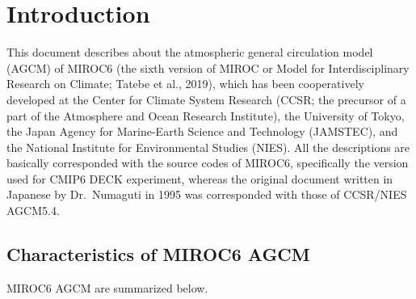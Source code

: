 \hypertarget{introduction}{%
\section{Introduction}\label{introduction}}

This document describes about the atmospheric general circulation model (AGCM) of MIROC6 (the sixth version of MIROC or Model for Interdisciplinary Research on Climate; Tatebe et al., 2019), which has
been cooperatively developed at the Center for Climate System Research (CCSR; the precursor of a part of the Atmosphere and Ocean Research Institute), the University of Tokyo, the Japan Agency for
Marine-Earth Science and Technology (JAMSTEC), and the National Institute for Environmental Studies (NIES). All the descriptions are basically corresponded with the source codes of MIROC6,
specifically the version used for CMIP6 DECK experiment, whereas the original document written in Japanese by Dr.~Numaguti in 1995 was corresponded with those of CCSR/NIES AGCM5.4.

\hypertarget{characteristics-of-miroc6-agcm}{%
\subsection{Characteristics of MIROC6 AGCM}\label{characteristics-of-miroc6-agcm}}

MIROC6 AGCM are summarized below.

